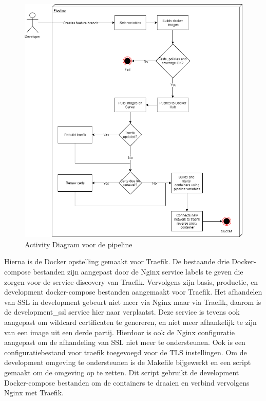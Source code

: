 \begin{figure}[H]
	\centering
	\includegraphics[width=13cm]{Figures/Activitydiagram}
	\decoRule
	\caption[Pipeline Activity Diagram]{Activity Diagram voor de pipeline}
	\label{activitydiagram}
\end{figure}

Hierna is de Docker opstelling gemaakt voor Traefik. De bestaande drie Docker-compose bestanden zijn aangepast door de Nginx service labels te geven die zorgen voor de service-discovery van Traefik. Vervolgens zijn basis, productie, en development docker-compose bestanden aangemaakt voor Traefik. Het afhandelen van SSL in development gebeurt niet meer via Nginx maar via Traefik, daarom is de development\_ssl service hier naar verplaatst. Deze service is tevens ook aangepast om wildcard certificaten te genereren, en niet meer afhankelijk te zijn van een image uit een derde partij. Hierdoor is ook de Nginx configuratie aangepast om de afhandeling van SSL niet meer te ondersteunen. Ook is een configuratiebestand voor traefik toegevoegd voor de TLS instellingen. Om de development omgeving te ondersteunen is de Makefile bijgewerkt en een script gemaakt om de omgeving op te zetten. Dit script gebruikt de development Docker-compose bestanden om de containers te draaien en verbind vervolgens Nginx met Traefik.

